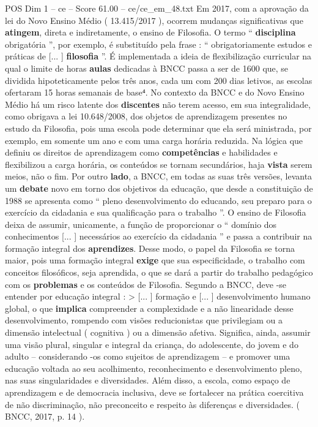 \begin{textsample}{POS Dim 1 – ce – Score 61.00 – ce/ce\_em\_48.txt}
Em 2017, com a aprovação da lei do Novo Ensino Médio ( 13.415/2017 ), ocorrem mudanças significativas que \textbf{atingem}, direta e indiretamente, o ensino de Filosofia.
O termo “ \textbf{disciplina} obrigatória ”, por exemplo, é substituído pela frase : “ obrigatoriamente estudos e práticas de [... ] \textbf{filosofia} ”.
É implementada a ideia de flexibilização curricular na qual o limite de horas \textbf{aulas} dedicadas à BNCC passa a ser de 1600 que, se dividida hipoteticamente pelos três anos, cada um com 200 dias letivos, as escolas ofertaram 15 horas semanais de base⁴.
No contexto da BNCC e do Novo Ensino Médio há um risco latente dos \textbf{discentes} não terem acesso, em sua integralidade, como obrigava a lei 10.648/2008, dos objetos de aprendizagem presentes no estudo da Filosofia, pois uma escola pode determinar que ela será ministrada, por exemplo, em somente um ano e com uma carga horária reduzida.
Na lógica que definiu os direitos de aprendizagem como \textbf{competências} e habilidades e flexibilizou a carga horária, os conteúdos se tornam secundários, haja \textbf{vista} serem meios, não o fim.
Por outro \textbf{lado}, a BNCC, em todas as suas três versões, levanta um \textbf{debate} novo em torno dos objetivos da educação, que desde a constituição de 1988 se apresenta como “ pleno desenvolvimento do educando, seu preparo para o exercício da cidadania e sua qualificação para o trabalho ”.
O ensino de Filosofia deixa de assumir, unicamente, a função de proporcionar o “ domínio dos conhecimentos [... ] necessários ao exercício da cidadania ” e passa a contribuir na formação integral dos \textbf{aprendizes}.
Desse modo, o papel da Filosofia se torna maior, pois uma formação integral \textbf{exige} que sua especificidade, o trabalho com conceitos filosóficos, seja aprendida, o que se dará a partir do trabalho pedagógico com os \textbf{problemas} e os conteúdos de Filosofia.
Segundo a BNCC, deve -se entender por educação integral : > [... ] formação e [... ] desenvolvimento humano global, o que \textbf{implica} compreender a complexidade e a não linearidade desse desenvolvimento, rompendo com visões reducionistas que privilegiam ou a dimensão intelectual ( cognitiva ) ou a dimensão afetiva.
Significa, ainda, assumir uma visão plural, singular e integral da criança, do adolescente, do jovem e do adulto – considerando -os como sujeitos de aprendizagem – e promover uma educação voltada ao seu acolhimento, reconhecimento e desenvolvimento pleno, nas suas singularidades e diversidades.
Além disso, a escola, como espaço de aprendizagem e de democracia inclusiva, deve se fortalecer na prática coercitiva de não discriminação, não preconceito e respeito às diferenças e diversidades. ( BNCC, 2017, p. 14 ).

\end{textsample}
